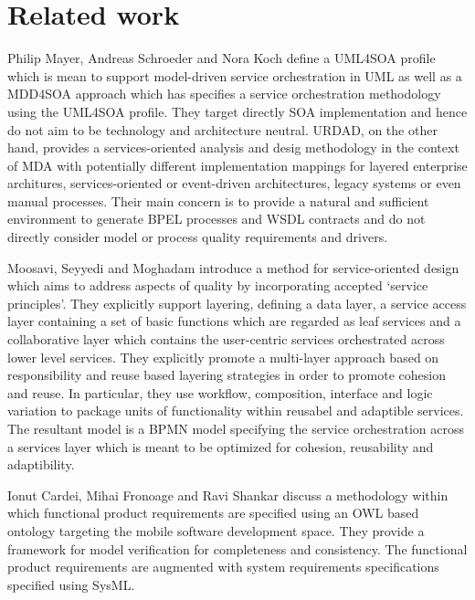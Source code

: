\section{Related work}
\label{sec:relatedWork}

Philip Mayer, Andreas Schroeder and Nora Koch\cite{mayer_mdd4soa:_2008} define a UML4SOA profile which is mean to support model-driven service orchestration in UML as well as a MDD4SOA approach which has specifies a service orchestration methodology using the UML4SOA profile. They target directly SOA implementation and hence do not aim to be technology and architecture neutral. URDAD, on the other hand, provides a services-oriented analysis and desig methodology in the context of MDA with potentially different implementation mappings for layered enterprise architures, services-oriented or event-driven architectures, legacy systems or even manual processes. Their main concern is to provide a natural and sufficient environment to generate BPEL processes and WSDL contracts and do not directly consider model or process quality requirements and drivers.

Moosavi, Seyyedi and Moghadam\cite{moosavi_method_2009} introduce a method for service-oriented design which aims to address aspects of quality by incorporating accepted `service principles'. They explicitly support layering, defining a data layer, a service access layer containing a set of basic functions which are regarded as leaf services and a collaborative layer which contains the user-centric services orchestrated across lower level services. They explicitly promote a multi-layer approach based on responsibility and reuse based layering strategies in order to promote cohesion and reuse. In particular, they use workflow, composition, interface and logic variation to package units of functionality within reusabel and adaptible services. The resultant model is a BPMN model specifying the service orchestration across a services layer which is meant to be optimized for cohesion, reusability and adaptibility.

Ionut Cardei, Mihai Fronoage and Ravi Shankar\cite{cardei_model_2008} discuss a methodology within which functional product requirements are specified using an OWL based ontology targeting the mobile software development space. They provide a framework for model verification for completeness and consistency. The functional product requirements are augmented with system requirements specifications specified using SysML.

